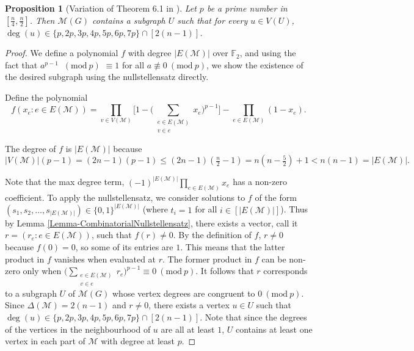 \documentclass[12]{article}
\newcommand{\Mod}[1]{\ (\mathrm{mod}\ #1)}
\newtheorem{prop}[thm]{Proposition}
\theoremstyle{definition}
\begin{document}
	\begin{prop}[Variation of Theorem 6.1 in \cite{alon}]\label{Prop-SubgraphNullstellensatzResult}
		Let $p$ be a prime number in $[\tfrac{n}{4},\tfrac{n}{2}]$.  Then $\mathcal{M}(G)$ contains a subgraph $U$ such that for every $u \in V(U)$, $\deg(u) \in \{p,2p, 3p,4p,5p,6p,7p\} \cap [2(n-1)]$.  %
	\end{prop}
	\begin{proof}
		We define a polynomial $f$ with degree $|E(\mathcal{M})|$ over $\mathbb{F}_2$, and using the fact that $a^{p-1}$ $\Mod{p}$ $\equiv 1$ for all $a \not\equiv 0 \Mod{p}$, we show the existence of the desired subgraph using the nullstellensatz directly.
		
		Define the polynomial
		$$f(x_e:e \in E(\mathcal{M})) = \prod_{v \in V(\mathcal{M})} \biggr[1 - \Big(\sum_{\substack{e \in E(\mathcal{M})\\ v \in e}}x_e \Big)^{p-1} \biggr] - \prod_{e \in E(\mathcal{M})}(1-x_e).$$
		
		The degree of $f$ is $|E(\mathcal{M})|$ because
		$$|V(\mathcal{M})| (p-1) = (2n-1)(p-1) \leq (2n-1)(\tfrac{n}{2}-1) = n(n-\tfrac{5}{2})+1 < n(n-1) = |E(\mathcal{M})|.$$
		
		Note that the max degree term, $(-1)^{|E(\mathcal{M})|}\prod_{e \in E(\mathcal{M})} x_e$ has a non-zero coefficient. 
		To apply the nullstellensatz, we consider solutions to $f$ of the form $(s_1,s_2,\ldots,s_{|E(\mathcal{M})|}) \in \{0,1\}^{|E(\mathcal{M})|}$ (where $t_i = 1$ for all $i \in [|E(\mathcal{M})|]$).  Thus by Lemma \ref{Lemma-CombinatorialNullstellensatz}, there exists a vector, call it $r=(r_e:e \in E(\mathcal{M}))$, such that $f(r) \neq 0$.  By the definition of $f$, $r \neq 0$ because $f(0) = 0$, so some of its entries are $1$.  This means that the latter product in $f$ vanishes when evaluated at $r$.  The former product in $f$ can be non-zero only when $\Big(\sum_{\substack{e \in E(\mathcal{M})\\ v \in e}}r_e \Big)^{p-1} \equiv 0 \Mod{p}$.  It follows that $r$ corresponds to a subgraph $U$ of $\mathcal{M}(G)$ whose vertex degrees are congruent to $0 \Mod{p}$.  Since $\Delta(\mathcal{M}) = 2(n-1)$ and $r \neq 0$, there exists a vertex $u \in U$ such that $\deg(u) \in \{p,2p, 3p, 4p, 5p, 6p, 7p\} \cap [2(n-1)]$.  Note that since the degrees of the vertices in the neighbourhood of $u$ are all at least $1$, $U$ contains at least one vertex in each part of $\mathcal{M}$ with degree at least $p$. \qedhere
	\end{proof}
\end{document}
